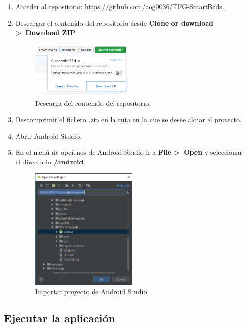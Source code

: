 \begin{enumerate}
	\item Acceder al repositorio: \url{https://github.com/aog0036/TFG-SmartBeds}. 
	\item Descargar el contenido del repositorio desde \textbf{Clone or download >~Download ZIP}. 
	\begin{figure}[H]
		\centering
		\includegraphics[width=0.5\textwidth]{../img/download.png}
		\caption{Descarga del contenido del repositorio.}
		\label{fig:download}
	\end{figure}
	\item Descomprimir el fichero .zip en la ruta en la que se desee alojar el proyecto. 
	\item Abrir Android Studio. 
	\item En el menú de opciones de Android Studio ir a \textbf{File >~Open} y seleccionar el directorio \textbf{/android}. 
	\begin{figure}[H]
		\centering
		\includegraphics[width=0.5\textwidth]{../img/open.png}
		\caption{Importar proyecto de Android Studio.}
		\label{fig:open}
	\end{figure}
\end{enumerate}

\subsection{Ejecutar la aplicación}

